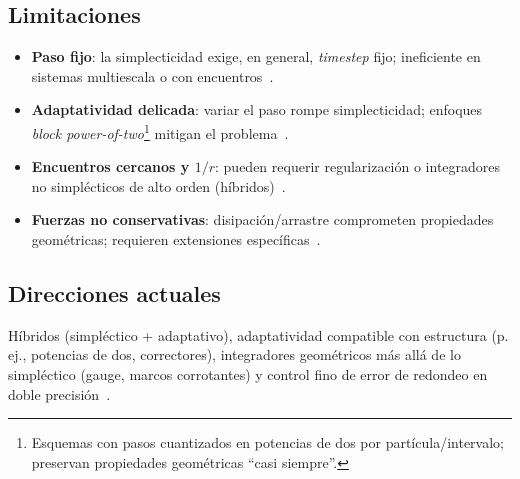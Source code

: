 \subsection{Limitaciones}
\begin{itemize}
  \item \textbf{Paso fijo}: la simplecticidad exige, en general, \emph{timestep} fijo; ineficiente en sistemas multiescala o con encuentros~\cite{stuchi2002, hernandez2020}.
  \item \textbf{Adaptatividad delicada}: variar el paso rompe simplecticidad; enfoques \emph{block power-of-two}\footnote{%
  Esquemas con pasos cuantizados en potencias de dos por partícula/intervalo; preservan propiedades geométricas “casi siempre”.} mitigan el problema~\cite{Hernandez2015, hernandez2019b}.
  \item \textbf{Encuentros cercanos y $1/r$}: pueden requerir regularización o integradores no simplécticos de alto orden (híbridos)~\cite{hernandez2020, rebound_doc}.
  \item \textbf{Fuerzas no conservativas}: disipación/arrastre comprometen propiedades geométricas; requieren extensiones específicas~\cite{hernandez2019b}.
\end{itemize}

\subsection{Direcciones actuales}
Híbridos (simpléctico + adaptativo), adaptatividad compatible con estructura (p.\,ej., potencias de dos, correctores), integradores geométricos más allá de lo simpléctico (gauge, marcos corrotantes) y control fino de error de redondeo en doble precisión~\cite{rebound_doc, Hernandez2015, yoshida1990, glasser2022, tu2019, rein2019}.
